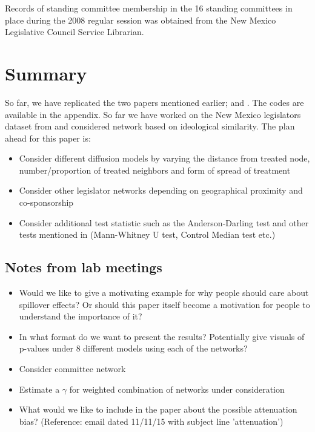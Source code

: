 \documentclass[12pt]{article}
\begin{document}
Records of standing committee membership in the 16 standing committees in place during the 2008 regular session was obtained from the New Mexico Legislative Council Service Librarian. 

\color{red}
\section{Summary}

So far, we have replicated the two papers mentioned earlier; \citep{bowers2012reasoning} and \citep{coppock2014information}. The codes are available in the appendix. So far we have worked on the New Mexico legislators dataset from \citep{butler2011can} and considered network based on ideological similarity. The plan ahead for this paper is:

\begin{itemize}

\item Consider different diffusion models by varying the distance from treated node, number/proportion of treated neighbors and form of spread of treatment
\item Consider other legislator networks depending on geographical proximity and co-sponsorship
\item Consider additional test statistic such as the Anderson-Darling test and other tests mentioned in \citep{rosenbaum2012interference} (Mann-Whitney U test, Control Median test etc.)

\end{itemize}

\color{black}

\subsection{Notes from lab meetings}
\begin{itemize}

\item Would we like to give a motivating example for why people should care about spillover effects? Or should this paper itself become a motivation for people to understand the importance of it?

\item In what format do we want to present the results? Potentially give visuals of p-values under 8 different models using each of the networks?

\item Consider committee network

\item Estimate a $\gamma$ for weighted combination of networks under consideration

\item What would we like to include in the paper about the possible attenuation bias? (Reference: email dated 11/11/15 with subject line 'attenuation')

\end{itemize}
\end{document}
